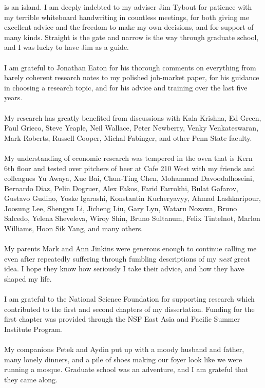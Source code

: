 
 is an island.  I am deeply indebted to my adviser Jim Tybout for patience with my terrible whiteboard handwriting in countless meetings, for both giving me excellent advice and the freedom to make my own decisions, and for support of many kinds.  Straight is the gate and narrow is the way through graduate school, and I was lucky to have Jim as a guide.\\
\vspace{1pt} \\
I am grateful to Jonathan Eaton for his thorough comments on everything from barely coherent research notes to my polished job-market paper, for his guidance in choosing a research topic, and for his advice and training over the last five years.\\
\vspace{1pt}\\
My research has greatly benefited from discussions with Kala Krishna, Ed Green, Paul Grieco, Steve Yeaple, Neil Wallace, Peter Newberry, Venky Venkateswaran, Mark Roberts, Russell Cooper, Michal Fabinger, and other Penn State faculty.\\
\vspace{1pt}\\
My understanding of economic research was tempered in the oven that is Kern 6th floor and tested over pitchers of beer at Cafe 210 West with my friends and colleagues Yu Awaya, Xue Bai, Chun-Ting Chen, Mohammad Davoodalhoseini, Bernardo Diaz, Pelin Dogruer, Alex Fakos, Farid Farrokhi, Bulat Gafarov, Gustavo Gudino, Yoske Igarashi, Konstantin Kucheryavyy, Ahmad Lashkaripour, Joosung Lee, Shengyu Li, Jicheng Liu, Gary Lyn, Wataru Nozawa, Bruno Salcedo, Yelena Sheveleva, Wiroy Shin, Bruno Sultanum, Felix Tintelnot, Marlon Williams, Hoon Sik Yang, and many others.\\
\vspace{1pt}\\
My parents Mark and Ann Jinkins were generous enough to continue calling me even after repeatedly suffering through fumbling descriptions of my \emph{next} great idea.  I hope they know how seriously I take their advice, and how they have shaped my life.\\
\vspace{1pt}\\
I am grateful to the National Science Foundation for supporting research which contributed to the first and second chapters of my dissertation.  Funding for the first chapter was provided through the NSF East Asia and Pacific Summer Institute Program.\\
\vspace{1pt}\\
My companions Petek and Aydin put up with a moody husband and father, many lonely dinners, and a pile of shoes making our foyer look like we were running a mosque.  Graduate school was an adventure, and I am grateful that they came along.
